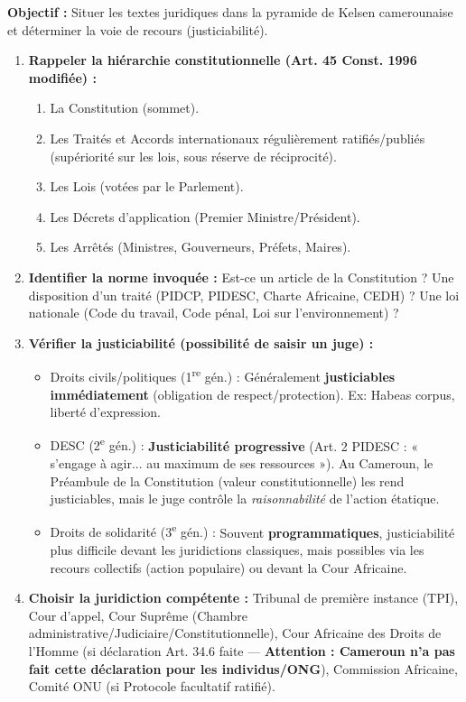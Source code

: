 \documentclass[11pt]{article}
\newcommand{\cle}[1]{{\popxbold\color{popdark}#1}}
\begin{document}
\begin{methode}
    \textbf{Objectif :} Situer les textes juridiques dans la pyramide de Kelsen camerounaise et déterminer la voie de recours (justiciabilité).
    \begin{enumerate}
        \item \textbf{Rappeler la hiérarchie constitutionnelle (Art. 45 Const. 1996 modifiée) :}
            \begin{enumerate}
                \item \cle{La Constitution} (sommet).
                \item \cle{Les Traités et Accords internationaux} régulièrement ratifiés/publiés (supériorité sur les lois, sous réserve de réciprocité).
                \item \cle{Les Lois} (votées par le Parlement).
                \item \cle{Les Décrets d'application} (Premier Ministre/Président).
                \item \cle{Les Arrêtés} (Ministres, Gouverneurs, Préfets, Maires).
            \end{enumerate}
        \item \textbf{Identifier la norme invoquée :} Est-ce un article de la Constitution ? Une disposition d'un traité (PIDCP, PIDESC, Charte Africaine, CEDH) ? Une loi nationale (Code du travail, Code pénal, Loi sur l'environnement) ?
        \item \textbf{Vérifier la justiciabilité (possibilité de saisir un juge) :}
            \begin{itemize}
                \item \cle{Droits civils/politiques (1\textsuperscript{re} gén.) :} Généralement \textbf{justiciables immédiatement} (obligation de respect/protection). Ex: Habeas corpus, liberté d'expression.
                \item \cle{DESC (2\textsuperscript{e} gén.) :} \textbf{Justiciabilité progressive} (Art. 2 PIDESC : « s'engage à agir... au maximum de ses ressources »). Au Cameroun, le Préambule de la Constitution (valeur constitutionnelle) les rend justiciables, mais le juge contrôle la \emph{raisonnabilité} de l'action étatique.
                \item \cle{Droits de solidarité (3\textsuperscript{e} gén.) :} Souvent \textbf{programmatiques}, justiciabilité plus difficile devant les juridictions classiques, mais possibles via les recours collectifs (action populaire) ou devant la Cour Africaine.
            \end{itemize}
        \item \textbf{Choisir la juridiction compétente :} Tribunal de première instance (TPI), Cour d'appel, Cour Suprême (Chambre administrative/Judiciaire/Constitutionnelle), Cour Africaine des Droits de l'Homme (si déclaration Art. 34.6 faite — \textbf{Attention : Cameroun n'a pas fait cette déclaration pour les individus/ONG}), Commission Africaine, Comité ONU (si Protocole facultatif ratifié).
    \end{enumerate}
\end{methode}
\end{document}
